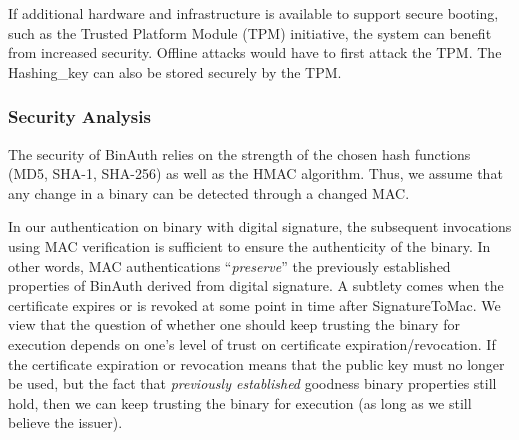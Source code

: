 If additional hardware and infrastructure is available to support
secure booting, such as the Trusted Platform Module (TPM) initiative,
the system can benefit from increased security.
Offline attacks would have to first attack the TPM.
The Hashing\_key can also be stored securely by the TPM.


\subsubsection{Security Analysis}
\label{sec:binauth-analysis}

The security of BinAuth relies on the strength
of the chosen hash functions (MD5, SHA-1, SHA-256) as well as
the HMAC algorithm.
Thus, we assume that any change in a binary can be detected through a changed MAC.

In our authentication on binary with digital signature, 
the subsequent invocations using MAC verification is sufficient 
to ensure the authenticity of the binary.
In other words, MAC authentications ``{\em preserve}'' the previously
established properties of BinAuth derived from digital signature.
A subtlety comes when the certificate expires or is revoked 
at some point in time after SignatureToMac.
We view that the question of whether one should keep trusting the binary for execution
depends on one's level of trust on certificate expiration/revocation.
If the certificate expiration or revocation means 
that the public key must no longer be used,
but the fact that {\em previously established} goodness binary properties still hold,
then we can keep trusting the binary for execution (as long as we still believe the issuer).

